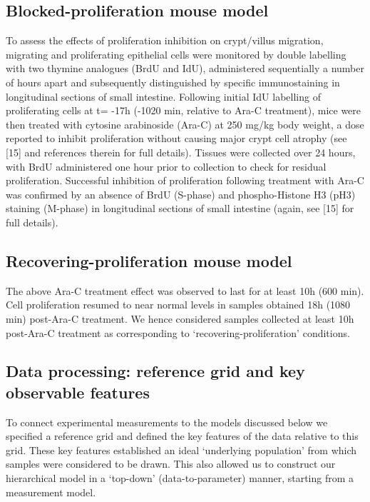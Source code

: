 \documentclass[10pt,letterpaper]{article}
\begin{document}
\subsection{Blocked-proliferation mouse
model}\label{blocked-proliferation-mouse-model}

To assess the effects of proliferation inhibition on crypt/villus
migration, migrating and proliferating epithelial cells were monitored
by double labelling with two thymine analogues (BrdU and IdU),
administered sequentially a number of hours apart and subsequently
distinguished by specific immunostaining in longitudinal sections of
small intestine. Following initial IdU labelling of proliferating cells
at t= -17h (-1020 min, relative to Ara-C treatment), mice were then
treated with cytosine arabinoside (Ara-C) at 250 mg/kg body weight, a
dose reported to inhibit proliferation without causing major crypt cell
atrophy (see {[}15{]} and references therein for full details). Tissues
were collected over 24 hours, with BrdU administered one hour prior to
collection to check for residual proliferation. Successful inhibition of
proliferation following treatment with Ara-C was confirmed by an absence
of BrdU (S-phase) and phospho-Histone H3 (pH3) staining (M-phase) in
longitudinal sections of small intestine (again, see {[}15{]} for full
details).

\subsection{Recovering-proliferation mouse
model}\label{recovering-proliferation-mouse-model}

The above Ara-C treatment effect was observed to last for at least 10h
(600 min). Cell proliferation resumed to near normal levels in samples
obtained 18h (1080 min) post-Ara-C treatment. We hence considered
samples collected at least 10h post-Ara-C treatment as corresponding to
`recovering-proliferation' conditions.

\subsection{Data processing: reference grid and key observable
features}\label{data-processing-reference-grid-and-key-observable-features}

To connect experimental measurements to the models discussed below we
specified a reference grid and defined the key features of the data
relative to this grid. These key features established an ideal
`underlying population' from which samples were considered to be drawn.
This also allowed us to construct our hierarchical model in a `top-down'
(data-to-parameter) manner, starting from a measurement model.
\end{document}

